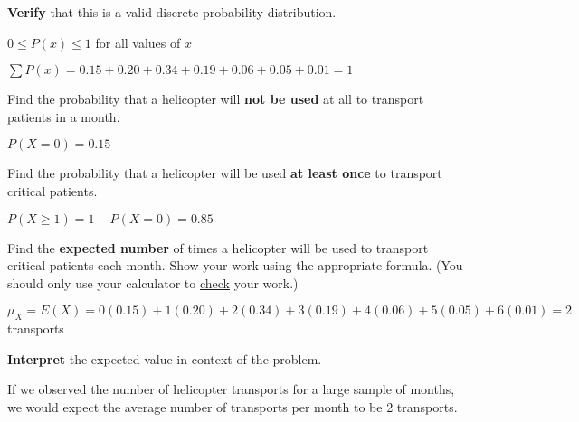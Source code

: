 \documentclass[noanswers]{exam}
\begin{document}
\begin{questions} 
		
	\question  \textbf{Verify} that this is a valid discrete probability distribution.
	
	\begin{solution}[\stretch{1}]
	
	$0\leq P(x)\leq 1$ for all values of $x$
	
	\vspace{3mm}

	$\sum P(x)=0.15+0.20+0.34+0.19+0.06+0.05+0.01=1$

	\vspace{2mm}

	\end{solution}
	
	\question Find the probability that a helicopter will \textbf{not be used} at all to transport patients in a month.
	
	\begin{solution}[\stretch{1}]

	$P(X=0)=0.15$
	
	\vspace{2mm}
	\end{solution}
	
	\question Find the probability that a helicopter will be used \textbf{at least once} to transport critical patients.
	
	\begin{solution}[\stretch{1}]

	$P(X\geq 1)=1-P(X=0)=0.85$
	
	\vspace{2mm}
	\end{solution}
	
	\question Find the \textbf{expected number} of times a helicopter will be used to transport critical patients each month. Show your work using the appropriate formula. (You should only use your calculator to \underline{check} your work.)
	
	\begin{solution}[\stretch{1}]
	\vspace{1mm}
	$\mu_X=E(X)=0(0.15)+1(0.20)+2(0.34)+3(0.19)+4(0.06)+5(0.05)+6(0.01)=2$ transports
	
	\vspace{2mm}
	\end{solution}
	
	\question \textbf{Interpret} the expected value in context of the problem.
	
	\begin{solution}[\stretch{1}]
	\vspace{1mm}
	If we observed the number of helicopter transports for a large sample of months, we would expect the average number of transports per month to be 2 transports.
	

\end{solution}
\end{questions}
\end{document}
